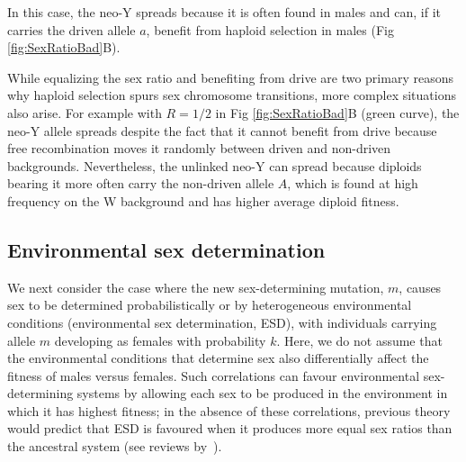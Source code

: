 \documentclass[10pt,letterpaper]{article}
\begin{document}
In this case, the neo-Y spreads because it is often found in males and can, if it carries the driven allele $a$, benefit from haploid selection in males (Fig \ref{fig:SexRatioBad}B).
%
%

While equalizing the sex ratio and benefiting from drive are two primary reasons why haploid selection spurs sex chromosome transitions, more complex situations also arise.  
For example with $R=1/2$ in Fig \ref{fig:SexRatioBad}B (green curve), the neo-Y allele spreads despite the fact that it cannot benefit from drive because free recombination moves it randomly between driven and non-driven backgrounds.  
Nevertheless, the unlinked neo-Y can spread because diploids bearing it more often carry the non-driven allele $A$, which is found at high frequency on the W background and has higher average diploid fitness.%

\subsection*{Environmental sex determination}

We next consider the case where the new sex-determining mutation, $m$, causes sex to be determined probabilistically or by heterogeneous environmental conditions (environmental sex determination, ESD), with individuals carrying allele $m$ developing as females with probability $k$.
Here, we do not assume that the environmental conditions that determine sex also differentially affect the fitness of males versus females. 
Such correlations can favour environmental sex-determining systems by allowing each sex to be produced in the environment in which it has highest fitness; in the absence of these correlations, previous theory would predict that ESD is favoured when it produces more equal sex ratios than the ancestral system (see reviews by~\cite{Charnov:1982wg,Bull:1983vi,West:2009we}). %
\end{document}
